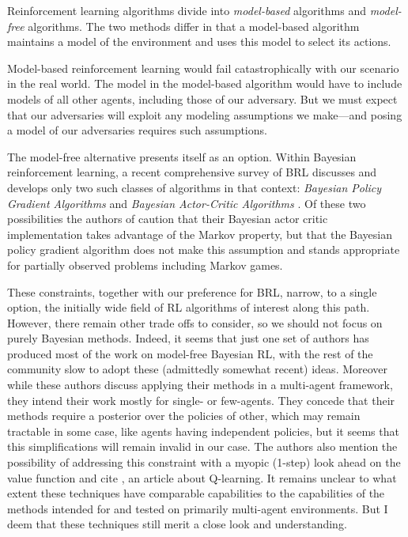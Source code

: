 \documentclass{article}
\begin{document}
Reinforcement learning algorithms divide into \emph{model-based}
algorithms and \emph{model-free} algorithms.  The two methods differ
in that a model-based algorithm maintains a model of the environment
and uses this model to select its actions.

Model-based reinforcement learning would fail catastrophically with
our scenario in the real world.  The model in the model-based
algorithm would have to include models of all other agents, including
those of our adversary.  But we must expect that our adversaries will
exploit any modeling assumptions we make---and posing a model of our
adversaries requires such assumptions.

The model-free alternative presents itself as an option.  Within
Bayesian reinforcement learning, a recent comprehensive survey of BRL
\cite{ghavamzadeh2016bayesian} discusses and develops only two such
classes of algorithms in that context: \emph{Bayesian Policy Gradient
  Algorithms} \cite{engel2007bayesian, ghavamzadeh2016abayesian} and
\emph{Bayesian Actor-Critic Algorithms} \cite{ghavamzadeh2007bayesian,
  ghavamzadeh2016abayesian}.  Of these two possibilities the authors
of \cite{ghavamzadeh2016bayesian} caution that their Bayesian actor
critic implementation takes advantage of the Markov property, but that
the Bayesian policy gradient algorithm does not make this assumption
and stands appropriate for partially observed problems including
Markov games.

These constraints, together with our preference for BRL, narrow, to a
single option, the initially wide field of RL algorithms of interest
along this path.  However, there remain other trade offs to consider,
so we should not focus on purely Bayesian methods.  Indeed, it seems
that just one set of authors has produced most of the work on
model-free Bayesian RL, with the rest of the community slow to adopt
these (admittedly somewhat recent) ideas.  Moreover while these
authors discuss applying their methods in a multi-agent framework,
they intend their work mostly for single- or few-agents.  They concede
that their methods require a posterior over the policies of other,
which may remain tractable in some case, like agents having
independent policies, but it seems that this simplifications will
remain invalid in our case.  The authors also mention the possibility
of addressing this constraint with a myopic (1-step) look ahead on the
value function and cite \cite{dearden1998bayesian}, an article about
Q-learning.  It remains unclear to what extent these techniques have
comparable capabilities to the capabilities of the methods intended
for and tested on primarily multi-agent environments.  But I deem that
these techniques still merit a close look and understanding.
\end{document}
